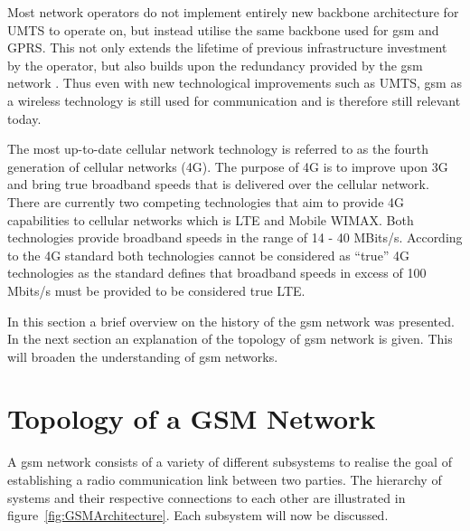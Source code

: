 Most network operators do not implement entirely new backbone architecture for \gls{UMTS}\label{UMTSGSMBackbone} to operate on, but instead utilise the same backbone used for \gls{gsm} and GPRS\@\cite{GSMArchitectureProtocolsServices}. This not only extends the lifetime of previous infrastructure investment by the operator, but also builds upon the redundancy provided by the \gls{gsm} network \cite{GSMArchitectureProtocolsServices}. Thus even with new technological improvements such as \gls{UMTS}, \gls{gsm} as a wireless technology is still used for communication and is therefore still relevant today\cite{GSMArchitectureProtocolsServices}.


The most up-to-date cellular network technology is referred to as the fourth generation of cellular networks (4G)\cite{4GWirelessVid}. The purpose of 4G is to improve upon 3G and bring true broadband speeds that is delivered over the cellular network\cite{4GWirelessVid}. There are currently two competing technologies that aim to provide 4G capabilities to cellular networks which is \gls{LTE} and Mobile \gls{WIMAX}\cite{4GWirelessVid}. Both technologies provide broadband speeds in the range of 14 - 40 MBits/s\cite{4GWirelessVid}. According to the 4G standard both technologies cannot be considered as ``true'' 4G technologies as the standard defines that broadband speeds in excess of 100 Mbits/s must be provided to be considered true \gls{LTE}\cite{4GWirelessVid}.

In this section a brief overview on the history of the \gls{gsm} network was presented. In the next section an explanation of the topology of \gls{gsm} network is given. This will broaden the understanding of \gls{gsm} networks.
\section{Topology of a GSM Network}
\label{sec:GSMArch}
A \gls{gsm} network consists of a variety of different subsystems to realise the goal of establishing a radio communication link between two parties. The hierarchy of systems and their respective connections to each other are illustrated in figure~\ref{fig:GSMArchitecture}. Each subsystem will now be discussed.

